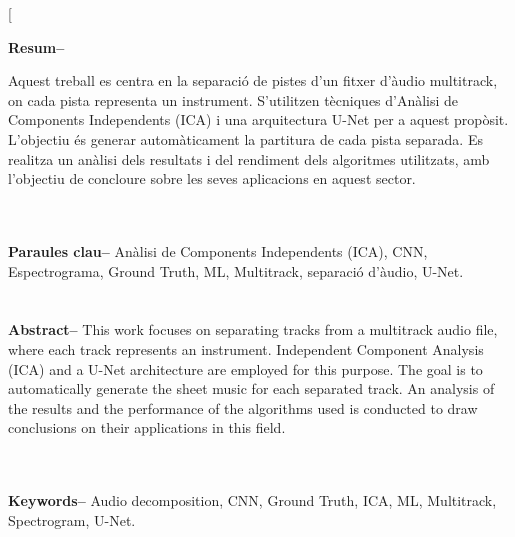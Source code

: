 \documentclass[10pt,a4paper,twocolumn,twoside]{article}
\begin{document}
\twocolumn[\begin{@twocolumnfalse}


\maketitle

\thispagestyle{primerapagina}
\begin{center}
\parbox{0.915\textwidth}
{\sffamily
\textbf{Resum--}

Aquest treball es centra en la separació de pistes d'un fitxer d'àudio multitrack, on cada pista representa un instrument. S'utilitzen tècniques d'Anàlisi de Components Independents (ICA) i una arquitectura U-Net per a aquest propòsit. L'objectiu és generar automàticament la partitura de cada pista separada. Es realitza un anàlisi dels resultats i del rendiment dels algoritmes utilitzats, amb l'objectiu de concloure sobre les seves aplicacions en aquest sector.

\\
\\
\textbf{Paraules clau-- } Anàlisi de Components Independents (ICA), CNN, Espectrograma, Ground Truth, ML, Multitrack, separació d'àudio, U-Net.\\
\\
\bigskip
\\
\textbf{Abstract--} 
This work focuses on separating tracks from a multitrack audio file, where each track represents an instrument. Independent Component Analysis (ICA) and a U-Net architecture are employed for this purpose. The goal is to automatically generate the sheet music for each separated track. An analysis of the results and the performance of the algorithms used is conducted to draw conclusions on their applications in this field.

\\
\\
\textbf{Keywords-- } Audio decomposition, CNN, Ground Truth, ICA, ML, Multitrack, Spectrogram, U-Net.\\
}


\end{center}
\end{@twocolumnfalse}
\end{document}
